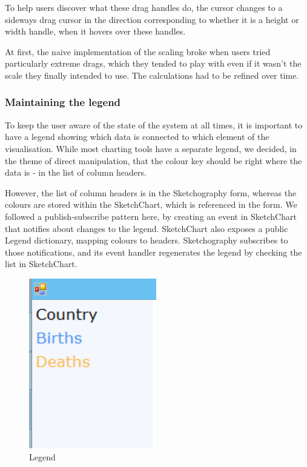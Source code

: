 	To help users discover what these drag handles do, the cursor changes to a sideways drag cursor in the direction corresponding to whether it is a height or width handle, when it hovers over these handles.	
	
	At first, the naive implementation of the scaling broke when users tried particularly extreme drags, which they tended to play with even if it wasn't the scale they finally intended to use. The calculations had to be refined over time.
	
	\subsubsection{Maintaining the legend}
	To keep the user aware of the state of the system at all times, it is important to have a legend showing which data is connected to which element of the visualisation. While most charting tools have a separate legend, we decided, in the theme of direct manipulation, that the colour key should be right where the data is - in the list of column headers. 
	
	However, the list of column headers is in the Sketchography form, whereas the colours are stored within the SketchChart, which is referenced in the form. We followed a publish-subscribe pattern here, by creating an event in SketchChart that notifies about changes to the legend. SketchChart also exposes a public Legend dictionary, mapping colours to headers. Sketchography subscribes to those notifications, and its event handler regenerates the legend by checking the list in SketchChart.	
	
	\begin{figure}
	\centering
	\includegraphics[scale=1]{legend}
	\caption{Legend}
	\end{figure}
	
	
